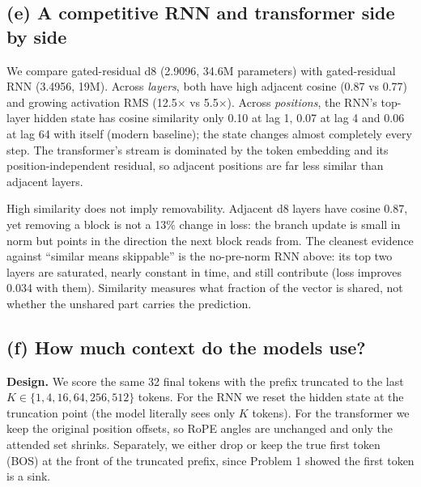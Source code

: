 \documentclass[10pt,letterpaper]{article}
\begin{document}
\subsection*{(e) A competitive RNN and transformer side by side}

We compare gated-residual d8 (2.9096, 34.6M parameters) with gated-residual RNN (3.4956, 19M). Across \emph{layers}, both have high adjacent cosine (0.87 vs 0.77) and growing activation RMS (12.5$\times$ vs 5.5$\times$). Across \emph{positions}, the RNN's top-layer hidden state has cosine similarity only 0.10 at lag 1, 0.07 at lag 4 and 0.06 at lag 64 with itself (modern baseline); the state changes almost completely every step. The transformer's stream is dominated by the token embedding and its position-independent residual, so adjacent positions are far less similar than adjacent layers.

High similarity does not imply removability. Adjacent d8 layers have cosine 0.87, yet removing a block is not a 13\% change in loss: the branch update is small in norm but points in the direction the next block reads from. The cleanest evidence against ``similar means skippable'' is the no-pre-norm RNN above: its top two layers are saturated, nearly constant in time, and still contribute (loss improves 0.034 with them). Similarity measures what fraction of the vector is shared, not whether the unshared part carries the prediction.

\subsection*{(f) How much context do the models use?}

\textbf{Design.} We score the same 32 final tokens with the prefix truncated to the last $K \in \{1,4,16,64,256,512\}$ tokens. For the RNN we reset the hidden state at the truncation point (the model literally sees only $K$ tokens). For the transformer we keep the original position offsets, so RoPE angles are unchanged and only the attended set shrinks. Separately, we either drop or keep the true first token (BOS) at the front of the truncated prefix, since Problem 1 showed the first token is a sink.
\end{document}
